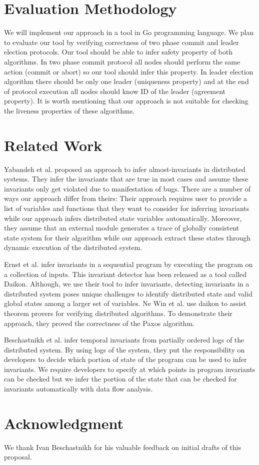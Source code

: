 \section{Evaluation Methodology}
We will implement our approach in a tool in Go programming language. We plan to evaluate our tool by verifying correctness of two phase commit and leader election protocols. Our tool should be able to infer safety property of both algorithms. In two phase commit protocol all nodes should perform the same action (commit or abort) so our tool should infer this property. In leader election algorithm there should be only one leader (uniqueness property) and at the end of protocol execution all nodes should know ID of the leader (agreement property). It is worth mentioning that our approach is not suitable for checking the liveness properties of these algorithms.

\section{Related Work}

Yabandeh et al.\cite{yabandeh2011finding} proposed an approach to
infer almost-invariants in distributed systems. They infer the
invariants that are true in most cases and assume these invariants
only get violated due to manifestation of bugs. There are a number of
ways our approach differ from theirs: Their approach requires user to
provide a list of variables and functions that they want to consider
for inferring invariants while our approach infers distributed state
variables automatically. Moreover, they assume that an external module
generates a trace of globally consistent state system for their
algorithm while our approach extract these states through dynamic
execution of the distributed system.

Ernst et al.\cite{ernst2001dynamically} infer invariants in a
sequential program by executing the program on a collection of inputs.
This invariant detector has been released as a tool called
Daikon\cite{ernst2007daikon}. Although, we use their tool to infer
invariants, detecting invariants in a distributed system poses unique
challenges to identify distributed state and valid global states among
a larger set of variables. Ne Win et al.\cite{NeWinEGKL04} use daikon
to assist theorem provers for verifying distributed algorithms. To
demonstrate their approach, they proved the correctness of the Paxos
algorithm.

Beschastnikh et al. \cite{temporalInv} infer temporal invariants from partially ordered logs of the distributed system. By using logs of the system, they put the responsibility on developers to decide which portion of state of the program can be used to infer invariants. We require developers to specify at which points in program invariants can be checked but we infer the portion of the state that can be checked for invariants automatically with data flow analysis.


\section{Acknowledgment}
We thank Ivan Beschastnikh for his valuable feedback on initial drafts of this proposal.